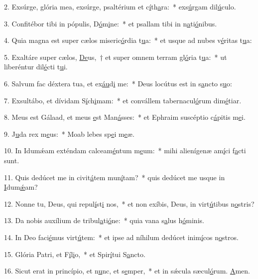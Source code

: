 2. Exsúrge, glória mea, exsúrge, psaltérium et c\uline{í}th\uline{a}ra:~* exs\uline{ú}rgam dil\uline{ú}culo.\par 
3. Confitébor tibi in pópulis, D\uline{ó}m\uline{i}ne:~* et psallam tibi in n\uline{a}ti\uline{ó}nibus.\par 
4. Quia magna est super cælos miseric\uline{ó}rdia t\uline{u}a:~* et usque ad nubes v\uline{é}ritas t\uline{u}a:\par 
5. Exaltáre super cælos, \uline{De}us,~† et super omnem terram gl\uline{ó}ria t\uline{u}a:~* ut liberéntur dil\uline{é}cti t\uline{u}i.\par 
6. Salvum fac déxtera tua, et ex\uline{áu}d\uline{i} me:~* Deus locútus est in s\uline{a}ncto s\uline{u}o:\par 
7. Exsultábo, et dívidam S\uline{í}ch\uline{i}mam:~* et convállem tabernacul\uline{ó}rum dim\uline{é}tiar.\par 
8. Meus est Gálaad, et meus \uline{e}st Man\uline{á}sses:~* et Ephraim suscéptio c\uline{á}pitis m\uline{e}i.\par 
9. J\uline{u}da rex m\uline{e}us:~* Moab lebes sp\uline{e}i m\uline{e}æ.\par 
10. In Idumǽam exténdam calceam\uline{é}ntum m\uline{e}um:~* mihi alienígenæ am\uline{í}ci f\uline{a}cti sunt.\par 
11. Quis dedúcet me in civit\uline{á}tem mun\uline{í}tam?~* quis dedúcet me usque in \uline{I}dum\uline{ǽ}am?\par 
12. Nonne tu, Deus, qui repul\uline{í}st\uline{i} nos,~* et non exíbis, Deus, in virt\uline{ú}tibus n\uline{o}stris?\par 
13. Da nobis auxílium de tribul\uline{a}ti\uline{ó}ne:~* quia vana s\uline{a}lus h\uline{ó}minis.\par 
14. In Deo faci\uline{é}mus virt\uline{ú}tem:~* et ipse ad níhilum dedúcet inim\uline{í}cos n\uline{o}stros.\par 
15. Glória Patri, et F\uline{í}l\uline{i}o,~* et Spir\uline{í}tui S\uline{a}ncto.\par 
16. Sicut erat in princípio, et n\uline{u}nc, et s\uline{e}mper,~* et in sǽcula sæcul\uline{ó}rum. \uline{A}men.\par 
